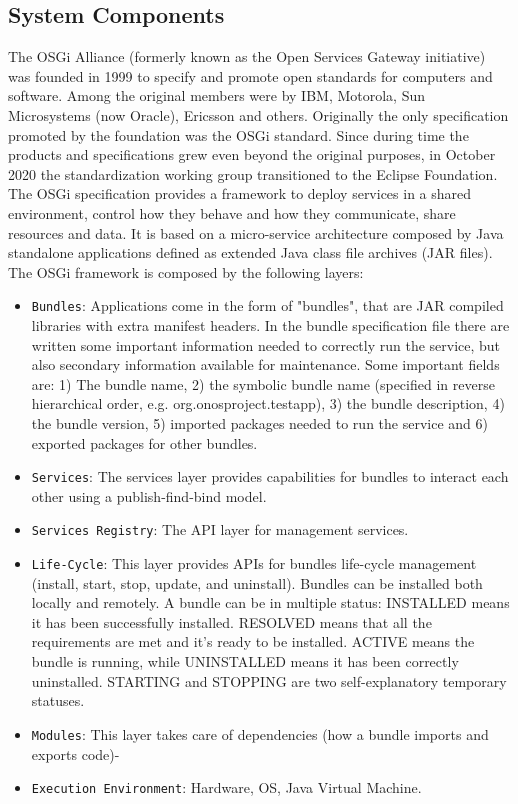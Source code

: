 \documentclass[a4paper,10pt]{memoir}
\begin{document}

\subsection{System Components}

The OSGi Alliance (formerly known as the Open Services Gateway initiative) was founded in 1999 to specify and promote open standards for computers and software. Among the original members were by IBM, Motorola, Sun Microsystems (now Oracle), Ericsson and others. Originally the only specification promoted by the foundation was the OSGi standard. Since during time the products and specifications grew even beyond the original purposes, in October 2020 the standardization working group transitioned to the Eclipse Foundation. The OSGi specification provides a framework to deploy services in a shared environment, control how they behave and how they communicate, share resources and data. It is based on a micro-service architecture composed by Java standalone applications defined as extended Java class file archives (JAR files). The OSGi framework is composed by the following layers:

\begin{itemize}
    \item\texttt{Bundles}: Applications come in the form of "bundles", that are JAR compiled libraries with extra manifest headers. In the bundle specification file there are written some important information needed to correctly run the service, but also secondary information available for maintenance. Some important fields are: 1) The bundle name, 2) the symbolic bundle name (specified in reverse hierarchical order, e.g. org.onosproject.testapp), 3) the bundle description, 4) the bundle version, 5) imported packages needed to run the service and 6) exported packages for other bundles.
    \item\texttt{Services}: The services layer provides capabilities for bundles to interact each other using a publish-find-bind model.
    \item\texttt{Services Registry}: The API layer for management services.
    \item\texttt{Life-Cycle}: This layer provides APIs for bundles life-cycle management (install, start, stop, update, and uninstall). Bundles can be installed both locally and remotely. A bundle can be in multiple status: INSTALLED means it has been successfully installed. RESOLVED means that all the requirements are met and it's ready to be installed. ACTIVE means the bundle is running, while UNINSTALLED means it has been correctly uninstalled. STARTING and STOPPING are two self-explanatory temporary statuses.
    \item\texttt{Modules}: This layer takes care of dependencies (how a bundle imports and exports code)-
    \item\texttt{Execution Environment}: Hardware, OS, Java Virtual Machine.
\end{itemize}
\end{document}
